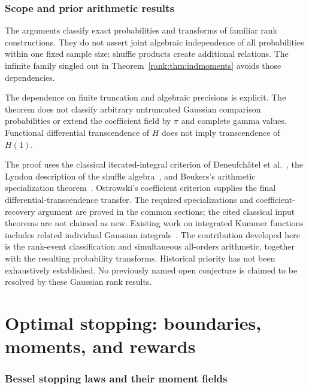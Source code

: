 \documentclass[11pt,a4paper]{article}
\newcommand{\E}{\mathcal E}
\theoremstyle{definition}
\theoremstyle{remark}
\numberwithin{equation}{section}
\begin{document}
\section{Scope and prior arithmetic results}
The arguments classify exact probabilities and transforms of familiar
rank constructions. They do not assert joint algebraic independence
of all probabilities within one fixed sample size: shuffle products
create additional relations. The infinite family singled out in
Theorem~\ref{rank:thm:indmoments} avoids those dependencies.

The dependence on finite truncation and algebraic precisions is explicit.
The theorem does not classify arbitrary untruncated Gaussian comparison
probabilities or extend the coefficient field by $\pi$ and complete
gamma values. Functional differential transcendence of $H$ does not
imply transcendence of $H(1)$.

The proof uses the classical iterated-integral criterion of
Deneufch\^atel et al.~\cite{DDS}, the Lyndon description of the
shuffle algebra~\cite{Radford}, and Beukers's arithmetic specialization
theorem~\cite{Beukers}. Ostrowski's coefficient criterion supplies
the final differential-transcendence transfer. The required specializations
and coefficient-recovery argument are proved in the common sections;
the cited classical input theorems are not claimed as new.
Existing work on integrated Kummer functions includes related individual
Gaussian integrals~\cite{GV}. The contribution developed here is the
rank-event classification and simultaneous all-orders arithmetic,
together with the resulting probability transforms. Historical priority
has not been exhaustively established. No previously named open conjecture
is claimed to be resolved by these Gaussian rank results.


\clearpage
\part{Optimal stopping: boundaries, moments, and rewards}\label{part:stopping}

\section{Bessel stopping laws and their moment fields}
\end{document}
